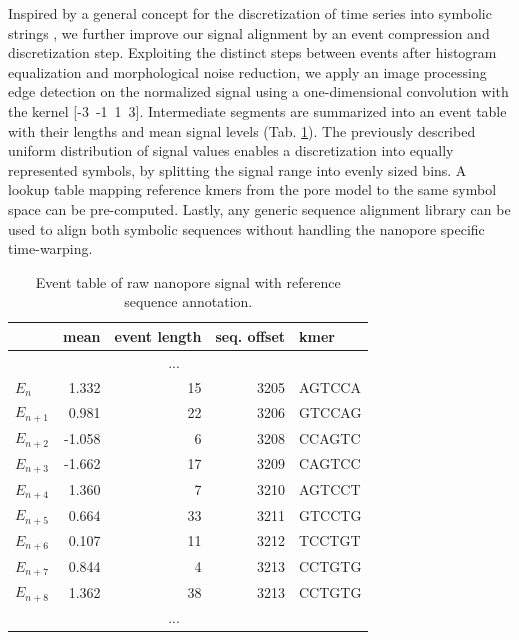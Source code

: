 Inspired by a general concept for the discretization of time series into symbolic strings \cite{Lin2003}, we further improve our signal alignment by an event compression and discretization step. Exploiting the distinct steps between events after histogram equalization and morphological noise reduction, we apply an image processing edge detection on the normalized signal using a one-dimensional convolution with the kernel [-3\ -1\ 1\ 3]. 
Intermediate segments are summarized into an event table with their lengths and mean signal levels (Tab. \ref{tab:signal:events}). 
The previously described uniform distribution of signal values enables a discretization into equally represented symbols, by splitting the signal range into evenly sized bins. 
A lookup table mapping reference kmers from the pore model to the same symbol space can be pre-computed. 
Lastly, any generic sequence alignment library can be used to align both symbolic sequences without handling the nanopore specific time-warping.


\begin{table}[ht]
	\centering
	\caption[Event detection and annotation]{Event table of raw nanopore signal with reference sequence annotation.}
	\label{tab:signal:events}
	\begin{tabular}{l|r|r|r|l}
		& mean & event length & seq. offset & kmer \\
		\hline 
		& \multicolumn{3}{c|}{...} &  \\
		\hline
		$ E_{n} $ &  1.332  & 15 & 3205 & AGTCCA \\
		\rowcolor{LightOrange}
		$ E_{n+1} $ &  0.981  & 22 & 3206 & GTCCAG \\
		$ E_{n+2} $ & -1.058  &  6 & 3208 & CCAGTC \\
		$ E_{n+3} $ & -1.662  & 17 & 3209 & CAGTCC \\
		$ E_{n+4} $ &  1.360  &  7 & 3210 & AGTCCT \\
		$ E_{n+5} $ &  0.664  & 33 & 3211 & GTCCTG \\
		$ E_{n+6} $ &  0.107  & 11 & 3212 & TCCTGT \\
		\rowcolor{LightGreen}
		$ E_{n+7} $ &  0.844  &  4 & 3213 & CCTGTG \\
		\rowcolor{LightGreen}
		$ E_{n+8} $ &  1.362  & 38 & 3213 & CCTGTG \\
		\hline
		& \multicolumn{3}{c|}{...} &  \\
	\end{tabular} 
\end{table}


